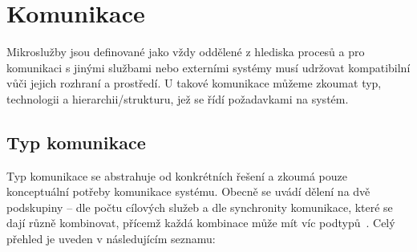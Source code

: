 \section{Komunikace }\label{sec:msa-communication}

Mikroslužby jsou definované jako vždy oddělené z hlediska procesů a pro komunikaci s jinými službami nebo externími systémy musí udržovat kompatibilní  vůči jejich rozhraní a prostředí.
U takové komunikace můžeme zkoumat typ, technologii a hierarchii/strukturu, jež se řídí požadavkami na systém.



\subsection{Typ komunikace}\label{subsec:msa-communication-type}
Typ komunikace se abstrahuje od konkrétních řešení a zkoumá pouze konceptuální potřeby komunikace systému.
Obecně se uvádí dělení na dvě podskupiny – dle počtu cílových služeb a dle synchronity komunikace, které se dají různě kombinovat, přícemž každá kombinace může mít víc podtypů~\cite{msachris}.
Celý přehled je uveden v následujícím seznamu:


